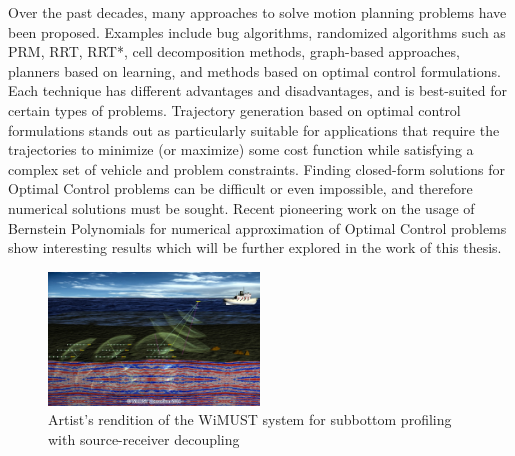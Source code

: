\par Over the past decades, many approaches to solve motion planning problems have been proposed. Examples include bug algorithms, randomized algorithms such as PRM, RRT, RRT*, cell decomposition methods, graph-based approaches, planners based on learning, and methods based on optimal control formulations. Each technique has different advantages and disadvantages, and is best-suited for certain types of problems. Trajectory generation based on optimal control formulations stands out as particularly suitable for applications that require the trajectories to minimize (or maximize) some cost function while satisfying a complex set of vehicle and problem constraints. Finding closed-form solutions for Optimal Control problems can be difficult or even impossible, and therefore numerical solutions must be sought. Recent pioneering work on the usage of Bernstein Polynomials for numerical approximation of Optimal Control problems show interesting results \cite{cichella2018bernstein} which will be further explored in the work of this thesis.

\begin{figure}[h!]
    \centering
    \includegraphics[width=0.5\textwidth]{Images/projects/WiMUST_project.jpg}
    \caption{Artist’s rendition of the WiMUST system for subbottom profiling with source-receiver decoupling}
    \label{fig:WiMUST_System}
\end{figure}


